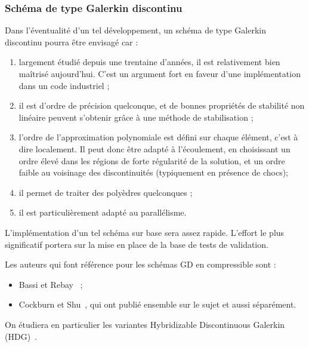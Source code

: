  

  

\subsubsection{Sch\'ema de type Galerkin discontinu}

Dans l'\'eventualit\'e d'un tel d\'eveloppement,  un sch\'ema de type Galerkin discontinu pourra \^etre envisag\'e car :
\begin{enumerate}
\item
largement \'etudi\'e depuis une trentaine d'ann\'ees, il est relativement bien ma\^itris\'e aujourd'hui. C'est un argument fort en faveur d'une impl\'ementation dans un code industriel ;
\item
il est d'ordre de pr\'ecision quelconque, et de bonnes propri\'et\'es de stabilit\'e non lin\'eaire peuvent s'obtenir gr\^ace \`a une m\'ethode de stabilisation ;
\item
l'ordre de l'approximation polynomiale est d\'efini sur chaque \'el\'ement, c'est \`a dire localement. Il peut donc \^etre adapt\'e \`a l'\'ecoulement, en choisissant un ordre \'elev\'e dans les r\'egions de forte r\'egularit\'e de la solution, et un ordre faible au voisinage des discontinuit\'es (typiquement en pr\'esence de chocs);
\item
il permet de traiter des poly\`edres quelconques ;
\item
il est particuli\`erement adapt\'e au parall\'elisme.
\end{enumerate}

 L'impl\'ementation d'un tel sch\'ema sur base {} sera assez rapide. L'effort le plus significatif portera sur la mise en place de la base de tests de validation.
 
 Les auteurs qui font  r\'ef\'erence pour les sch\'emas GD en compressible sont :
 \begin{itemize}
 \item
 Bassi et Rebay~\cite{Bassi-Rebay} ;
 \item
 Cockburn et Shu~\cite{Cockburn-Shu}, qui ont publi\'e ensemble sur le sujet et aussi s\'epar\'ement.
 \end{itemize}

On \'etudiera en particulier les variantes  Hybridizable Discontinuous Galerkin (HDG)~\cite{Cockburn-HDG}.

